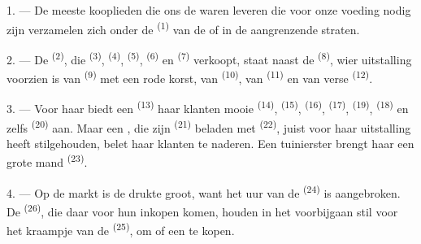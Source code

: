 
\VUsaut{4.0mm}
\VUsaut{3.0mm}

\VUsaut{3.0mm}

1. --- De meeste kooplieden die ons de waren leveren die voor onze voeding nodig zijn
verzamelen zich onder de  \textsuperscript{(1)} van de
 of in de aangrenzende straten.

2. --- De  \textsuperscript{(2)}, die 
\textsuperscript{(3)},  \textsuperscript{(4)},
 \textsuperscript{(5)}, 
\textsuperscript{(6)} en  \textsuperscript{(7)} verkoopt, staat naast de
 \textsuperscript{(8)}, wier uitstalling voorzien is van
 \textsuperscript{(9)} met een rode korst, van 
\textsuperscript{(10)}, van
 \textsuperscript{(11)} en van verse
 \textsuperscript{(12)}.

3. --- Voor haar biedt een  \textsuperscript{(13)} haar klanten
mooie  \textsuperscript{(14)},
 \textsuperscript{(15)}, 
\textsuperscript{(16)},  \textsuperscript{(17)},
 \textsuperscript{(19)}, 
\textsuperscript{(18)} en zelfs  \textsuperscript{(20)} aan. Maar een
, die zijn  \textsuperscript{(21)} beladen met
 \textsuperscript{(22)}, juist voor haar uitstalling heeft stilgehouden,
belet haar klanten te naderen. Een tuinierster brengt haar een grote mand 
\textsuperscript{(23)}.

\VUsaut{4.0mm}
\VUsaut{3.0mm}

4. --- Op de markt is de drukte groot, want het uur van de 
\textsuperscript{(24)} is aangebroken. De  \textsuperscript{(26)}, die
daar voor hun inkopen komen, houden in het voorbijgaan stil voor het kraampje van de
 \textsuperscript{(25)}, om  of een  te
kopen.

